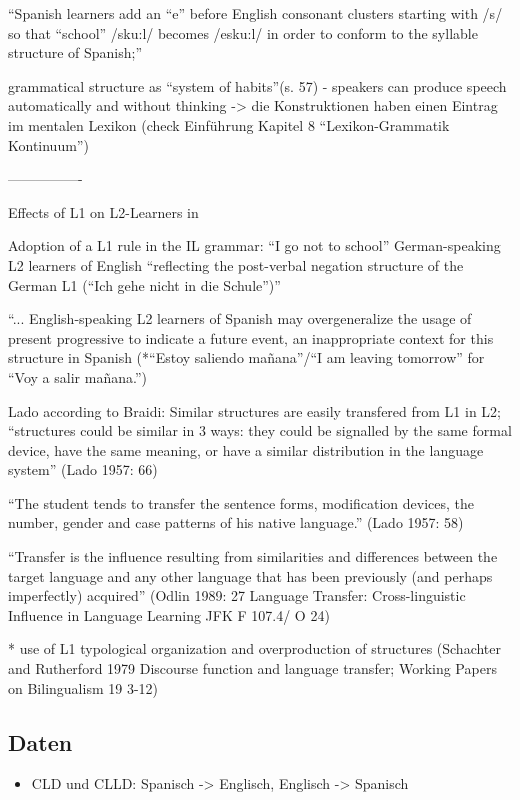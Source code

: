 ``Spanish learners add an ``e'' before English consonant clusters starting with /s/ so that ``school'' /sku:l/ becomes /esku:l/ in order to conform to the syllable structure of Spanish;''

grammatical structure as ``system of habits''(s. 57) - speakers can produce speech automatically and without thinking -> die Konstruktionen haben einen Eintrag im mentalen Lexikon (check Einführung \cite{Ziem13} Kapitel 8 ``Lexikon-Grammatik Kontinuum'')

----------------

Effects of L1 on L2-Learners in \cite{Braidi99}


Adoption of a L1 rule in the IL grammar:
``I go not to school'' German-speaking L2 learners of English ``reflecting the post-verbal negation structure
of the German L1 (``Ich gehe nicht in die Schule'')''

``... English-speaking L2 learners of Spanish may overgeneralize the usage of present progressive to indicate a
future event, an inappropriate context for this structure in Spanish (*``Estoy saliendo mañana''/``I am leaving tomorrow''
for ``Voy a salir mañana.'')


Lado according to Braidi:
Similar structures are easily transfered from L1 in L2;
``structures could be similar in 3 ways: they could be signalled by the same formal device, have the same meaning,
or have a similar distribution in the language system'' (Lado 1957: 66)

``The student tends to transfer the sentence forms, modification devices, the number, gender and case patterns of
his native language.'' (Lado 1957: 58)

``Transfer is the influence resulting from similarities and differences between the target language and any other
language that has been previously (and perhaps imperfectly) acquired'' (Odlin 1989: 27 Language Transfer: Cross-linguistic Influence in Language Learning
JFK F 107.4/ O 24)

* use of L1 typological organization and overproduction of structures (Schachter and Rutherford 1979 Discourse function and language transfer; Working Papers on Bilingualism 19 3-12)


\subsection{Daten}
\begin{itemize}
    \item \cite{Valenzuela05} CLD und CLLD: Spanisch -> Englisch, Englisch -> Spanisch
%
%
\end{itemize}
